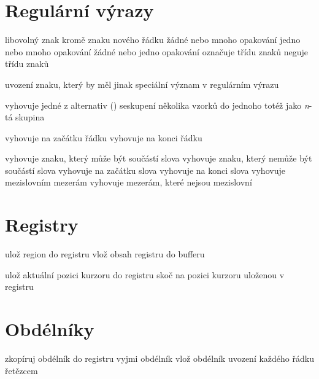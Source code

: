 \section{Regulární výrazy}

 libovolný znak kromě znaku nového řádku
\key{*} žádné nebo mnoho opakování
\key{+} jedno nebo mnoho opakování
 žádné nebo jedno opakování
\key{[$\ldots$]} označuje třídu znaků
\key{[\^{}$\ldots$]} neguje třídu znaků

 uvození znaku, který by měl jinak speciální význam v
regulárním výrazu

\key{$\ldots$\\|$\ldots$\\|$\ldots$} vyhovuje jedné z alternativ ()
\key{\\( $\ldots$ \\)} seskupení několika vzorků do jednoho
 totéž jako {\it n\/}-tá skupina

\key{\^{}} vyhovuje na začátku řádku
\key{\$} vyhovuje na konci řádku

\key{\\w} vyhovuje znaku, který může být součástí slova
\key{\\W} vyhovuje znaku, který nemůže být součástí slova
\key{\\<} vyhovuje na začátku slova
\key{\\>} vyhovuje na konci slova
\key{\\b} vyhovuje mezislovním mezerám
\key{\\B} vyhovuje mezerám, které nejsou mezislovní

\section{Registry}

 ulož region do registru
 vlož obsah registru do bufferu

 ulož aktuální pozici kurzoru do registru
 skoč na pozici kurzoru uloženou v registru

\section{Obdélníky}

 zkopíruj obdélník do registru
 vyjmi obdélník
 vlož obdélník
 uvození každého řádku řetězcem

